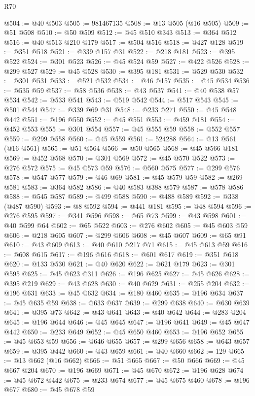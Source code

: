 \begin{lexlean}{R70}
\begin{coremodule}
@504 := @40 @503
@505 := 981467135
@508 := @13 @505 (@16 @505)
@509 := @51 @508
@510 := @50 @509
@512 := @45 @510 @343
@513 := @364 @512
@516 := @40 @513 @210 @179
@517 := @504 @516
@518 := @427 @128
@519 := @351 @518
@521 := @339 @157 @31
@522 := @218 @181
@523 := @395 @522
@524 := @301 @523
@526 := @45 @524 @59
@527 := @422 @526
@528 := @299 @527
@529 := @45 @528
@530 := @395 @181
@531 := @529 @530
@532 := @301 @531
@533 := @521 @532
@534 := @46 @157
@535 := @45 @534
@536 := @535 @59
@537 := @58 @536
@538 := @43 @537
@541 := @40 @538 @57 @534
@542 := @533 @541
@543 := @519 @542
@544 := @517 @543
@545 := @501 @544
@547 := @339 @69 @31
@548 := @233 @271
@550 := @45 @548 @442
@551 := @196 @550
@552 := @45 @551
@553 := @459 @181
@554 := @452 @553
@555 := @301 @554
@557 := @45 @555 @59
@558 := @552 @557
@559 := @299 @558
@560 := @45 @559
@561 := 524288
@564 := @13 @561 (@16 @561)
@565 := @51 @564
@566 := @50 @565
@568 := @45 @566 @181
@569 := @452 @568
@570 := @301 @569
@572 := @45 @570 @522
@573 := @276 @572
@575 := @45 @573 @59
@576 := @560 @575
@577 := @299 @576
@578 := @547 @577
@579 := @46 @69
@581 := @45 @579 @59
@582 := @269 @581
@583 := @364 @582
@586 := @40 @583 @388 @579
@587 := @578 @586
@588 := @545 @587
@589 := @499 @588
@590 := @488 @589
@592 := @338 (@487 @590)
@593 := @8 @592
@594 := @441 @181
@595 := @48 @594
@596 := @276 @595
@597 := @341 @596
@598 := @65 @73
@599 := @43 @598
@601 := @40 @599 @64
@602 := @65 @522
@603 := @276 @602
@605 := @45 @603 @59
@606 := @218 @605
@607 := @299 @606
@608 := @45 @607
@609 := @65 @91
@610 := @43 @609
@613 := @40 @610 @217 @71
@615 := @45 @613 @59
@616 := @608 @615
@617 := @196 @616
@618 := @601 @617
@619 := @351 @618
@620 := @133 @530
@621 := @40 @620
@622 := @621 @179
@623 := @301 @595
@625 := @45 @623 @311
@626 := @196 @625
@627 := @45 @626
@628 := @395 @219
@629 := @43 @628
@630 := @40 @629
@631 := @255 @204
@632 := @196 @631
@633 := @45 @632
@634 := @180 @460
@635 := @196 @634
@637 := @45 @635 @59
@638 := @633 @637
@639 := @299 @638
@640 := @630 @639
@641 := @395 @73
@642 := @43 @641
@643 := @40 @642
@644 := @283 @204
@645 := @196 @644
@646 := @45 @645
@647 := @196 @641
@649 := @45 @647 @442
@650 := @233 @649
@652 := @45 @650 @460
@653 := @196 @652
@655 := @45 @653 @59
@656 := @646 @655
@657 := @299 @656
@658 := @643 @657
@659 := @395 @442
@660 := @43 @659
@661 := @40 @660
@662 := 129
@665 := @13 @662 (@16 @662)
@666 := @51 @665
@667 := @50 @666
@669 := @45 @667 @204
@670 := @196 @669
@671 := @45 @670
@672 := @196 @628
@674 := @45 @672 @442
@675 := @233 @674
@677 := @45 @675 @460
@678 := @196 @677
@680 := @45 @678 @59

\end{coremodule}
\end{lexlean}

